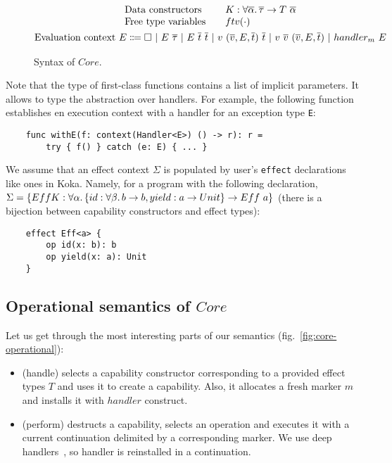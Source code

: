 \documentclass[acmsmall]{acmart}
\newcommand{\vor}{~|~}
\newcommand{\ap}{~}
\begin{document}
\begin{figure}
\begin{gather*}
\begin{array}{lrl}
            \text{Data constructors} & & K : \forall\overline{\alpha}\ldotp \overline{\tau}\to T\ap \overline{\alpha} \\
            \text{Free type variables} & & ftv(\cdot) \\
        \end{array}\\
        \begin{aligned}
            \text{Evaluation context } E \Coloneqq \square \vor E \ap \overline{\tau} \vor E \ap \overline{t}\ap \overline{t} \vor v \ap (\overline{v}, E, \overline{t}) \ap \overline{t} \vor v \ap \overline{v} \ap (\overline{v}, E, \overline{t}) \vor handler_m ~ E
        \end{aligned}\\
    \end{gather*}
    \caption{Syntax of $Core$.}
    \label{fig:core-syntax}
\end{figure}

Note that the type of first-class functions contains a list of implicit parameters.
It allows to type the abstraction over handlers.
For example, the following function establishes en execution context with a handler for an exception type \texttt{E}:
\begin{verbatim}
    func withE(f: context(Handler<E>) () -> r): r =
        try { f() } catch (e: E) { ... }
\end{verbatim}

We assume that an effect context $\Sigma$ is populated by user's \texttt{effect} declarations like ones in Koka. %
Namely, for a program with the following declaration, $\Sigma = \{EffK : \forall\alpha\ldotp\{id : \forall\beta\ldotp b\to b, yield : a \to Unit\} \to Eff\ap a\}$ (there is a bijection between capability constructors and effect types):
\begin{verbatim}
    effect Eff<a> {
        op id(x: b): b
        op yield(x: a): Unit
    }
\end{verbatim}

\subsection{Operational semantics of $Core$}

Let us get through the most interesting parts of our semantics (fig.\ \ref{fig:core-operational}):
\begin{itemize}
    \item (handle) selects a capability constructor corresponding to a provided effect types $T$ and uses it to create a capability.
    Also, it allocates a fresh marker $m$ and installs it with $handler$ construct.
    \item (perform) destructs a capability, selects an operation and executes it with a current continuation delimited by a corresponding marker.
    We use deep handlers~\cite{hillerstrom2018shallow}, so handler is reinstalled in a continuation.
\end{itemize}
\end{document}
